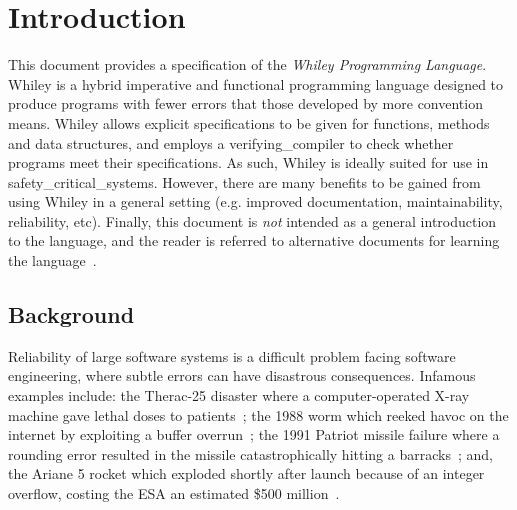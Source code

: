 \chapter{Introduction}

This document provides a specification of the {\em Whiley Programming
  Language}.  Whiley is a hybrid imperative and functional programming
language designed to produce programs with fewer errors that those
developed by more convention means.  Whiley allows explicit
specifications to be given for functions, methods and data structures,
and employs a \gls{verifying_compiler} to check whether programs meet their specifications.  As such, Whiley is ideally suited
for use in \gls{safety_critical_system}s.  However, there are many
benefits to be gained from using Whiley in a general setting
(e.g. improved documentation, maintainability, reliability, etc).
Finally, this document is {\em not} intended as a general introduction
to the language, and the reader is referred to alternative documents
for learning the language~\cite{X}.


\section{Background}

Reliability of large software systems is a difficult problem facing
software engineering, where subtle errors can have disastrous
consequences.  Infamous examples include: the Therac-25 disaster where
a computer-operated X-ray machine gave lethal doses to
patients~\cite{LT93}; the 1988 worm which reeked havoc on the internet
by exploiting a buffer overrun~\cite{ER89}; the 1991 Patriot missile
failure where a rounding error resulted in the missile catastrophically
hitting a barracks~\cite{GAO}; and, the Ariane 5 rocket which exploded
shortly after launch because of an integer overflow, costing the ESA
an estimated \$500 million~\cite{ARIAN5}.


